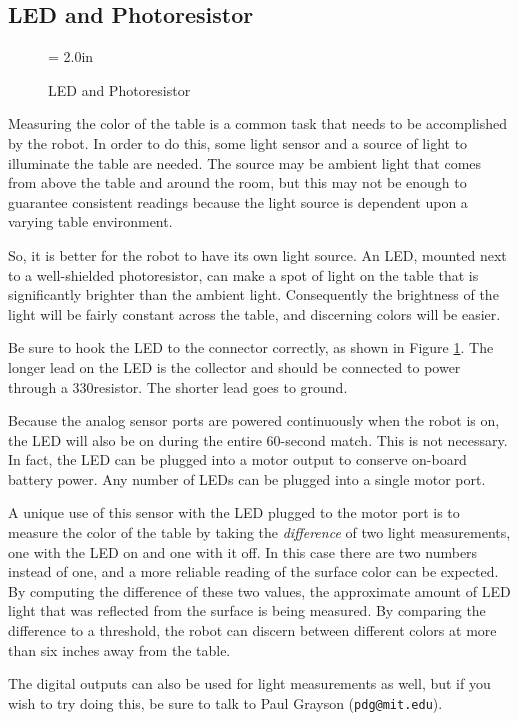 \subsection{LED and Photoresistor}

\begin{figure}[htbp]
 \centerline{\epsfysize = 2.0in}
 \caption{LED and Photoresistor}
 \label{ledpresistor}
\end{figure}

Measuring the color of the table is a common task that needs to be
accomplished by the robot. In order to do this, some light sensor and
a source of light to illuminate the table are needed. The source may
be ambient light that comes from above the table and around the room,
but this may not be enough to guarantee consistent readings because
the light source is dependent upon a varying table environment.

So, it is better for the robot to have its own light source. An LED,
mounted next to a well-shielded photoresistor, can make a spot of light
on the table that is significantly brighter than the ambient light.
Consequently the brightness of the light will be fairly constant
across the table, and discerning colors will be easier.

Be sure to hook the LED to the connector correctly, as shown in Figure
\ref{ledpresistor}.  The longer lead on the LED is the collector and
should be connected to power through a 330\ohm resistor.  The shorter
lead goes to ground.

Because the analog sensor ports are powered continuously when the
robot is on, the LED will also be on during the entire 60-second
match. This is not necessary. In fact, the LED can be plugged into a
motor output to conserve on-board battery power. Any number of LEDs
can be plugged into a single motor port.

A unique use of this sensor with the LED plugged to the motor port is
to measure the color of the table by taking the {\it difference} of
two light measurements, one with the LED on and one with it off. In
this case there are two numbers instead of one, and a more reliable
reading of the surface color can be expected. By computing the
difference of these two values, the approximate amount of LED light
that was reflected from the surface is being measured. By comparing
the difference to a threshold, the robot can discern between different
colors at more than six inches away from the table.

The digital outputs can also be used for light measurements as
well, but if you wish to try doing this, be sure to talk to Paul
Grayson ({\tt pdg@mit.edu}).

